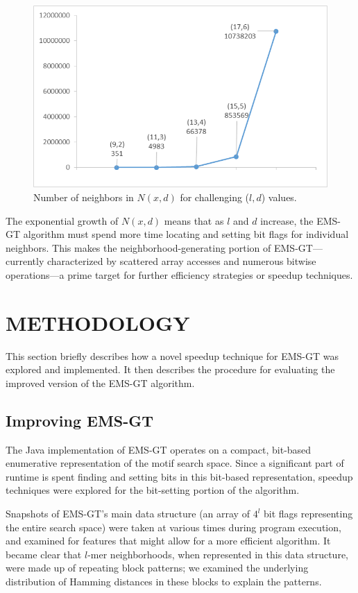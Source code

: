 \documentclass[oneside,12pt]{DISCSthesis}
\begin{document}
{			\begin{figure}[h]\label{fig:nxd}
				\centering
				\includegraphics{img/nbrhd_growth.png}
				\caption{Number of neighbors in $N(x,d)$ for challenging ($l,d$) values.}
				\end{figure}
			
			The exponential growth of $N(x,d)$ means that as $l$ and $d$ increase, the EMS-GT algorithm must spend more time locating and setting bit flags for individual neighbors. This makes the neighborhood-generating portion of EMS-GT---currently characterized by scattered array accesses and numerous bitwise operations---a prime target for further efficiency strategies or speedup techniques. 

\chapter{METHODOLOGY}
	This section briefly describes how a novel speedup technique for EMS-GT was explored and implemented.
	It then describes the procedure for evaluating the improved version of the EMS-GT algorithm.

	\section{Improving EMS-GT}
		The Java implementation of EMS-GT operates on a compact, bit-based enumerative representation of the motif search space. Since a significant part of runtime is spent finding and setting bits in this bit-based representation, speedup techniques were explored for the bit-setting portion of the algorithm.

		Snapshots of EMS-GT's main data structure (an array of $4^l$ bit flags representing the entire search space) were taken at various times during program execution, and examined for features that might allow for a more efficient algorithm. It became clear that $l$-mer neighborhoods, when represented in this data structure, were made up of repeating block patterns; we examined the underlying distribution of Hamming distances in these blocks to explain the patterns.

}
\end{document}
